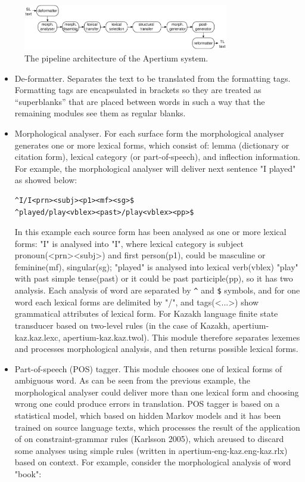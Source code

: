 \documentclass[11pt]{article}
\begin{document}
\begin{figure}[htbp]
\begin{center}
 \includegraphics[width=0.8\textwidth]{architecture.pdf}
\end{center}
\caption{The pipeline architecture of the Apertium system.}
\label{fig:modules}
\end{figure}

\begin{itemize}
\item 	De-formatter. Separates the text to be translated from the formatting tags.  Formatting tags are encapsulated in brackets so they are treated as “superblanks” that are placed between words in such a way that the remaining modules see them as regular blanks.  
\item	Morphological analyser. For each surface form the morphological analyser generates one or more lexical forms, which consist of: lemma (dictionary or citation form), lexical category (or part-of-speech), and inflection information. 
For example, the morphological analyser will deliver next sentence "I played" as showed below:
\begin{verbatim}
^I/I<prn><subj><p1><mf><sg>$ 
^played/play<vblex><past>/play<vblex><pp>$
\end{verbatim}
In this example each source form has been analysed as one or more lexical forms: "I" is analysed into "I", where lexical category is subject pronoun(<prn><subj>) and first person(p1), could be masculine or feminine(mf), singular(sg); "played" is analysed into lexical verb(vblex) "play" with past simple tense(past) or it could be past participle(pp), so it has two analysis. Each analysis of word are separated by \texttt{\^{}} and \texttt{\$} symbols, and for one word each lexical forms are delimited by "/", and tags(<...>) show grammatical attributes of lexical form. 
 For Kazakh language finite state transducer based on two-level rules (in the case of Kazakh, apertium-kaz.kaz.lexc, apertium-kaz.kaz.twol). This module therefore separates lexemes and processes morphological analysis, and then returns possible lexical forms.
\item	Part-of-speech (POS) tagger. This module chooses one of lexical forms of ambiguous word. As can be seen from the previous example, the morphological analyser could deliver more than one lexical form and choosing wrong one could produce errors in translation. POS tagger is based on a statistical model, which based on hidden Markov models and it has been trained on source language texts, which processes the result of the application of  on constraint-grammar rules (Karlsson 2005), which areused to discard some analyses  using simple rules (written in apertium-eng-kaz.eng-kaz.rlx) based on context. For example, consider the morphological analysis of word "book":

\end{itemize}
\end{document}
